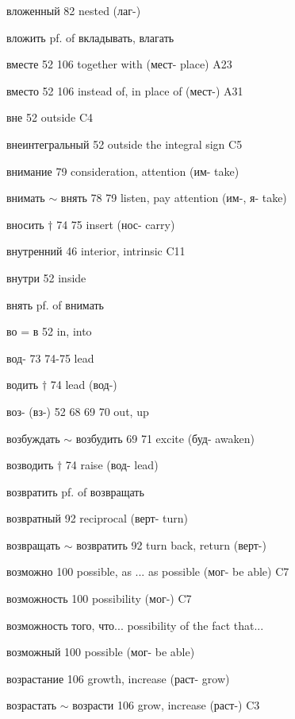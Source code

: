 \begin{minipage}[t]{0.475\textwidth}
\raggedright
\noindent вложенный 82 nested (лаг-)\par
\noindent вложить pf. of вкладывать, влагать\par
\noindent вместе 52 106 together with (мест- place) A23\par
\noindent вместо 52 106 instead of, in place of (мест-) A31\par
\noindent вне 52 outside C4\par
\noindent внеинтегральный 52 outside the integral sign C5\par
\noindent внимание 79 consideration, attention (им- take)\par
\noindent внимать $\sim$ внять 78 79 listen, pay attention (им-, я- take)\par
\noindent вносить $\dagger$ 74 75 insert (нос- carry)\par
\noindent внутренний 46 interior, intrinsic C11\par
\noindent внутри 52 inside\par
\noindent внять pf. of внимать\par
\noindent во = в 52 in, into\par
\noindent вод- 73 74-75 lead\par
\noindent водить $\dagger$ 74 lead (вод-)\par
\noindent воз- (вз-) 52 68 69 70 out, up\par
\noindent возбуждать $\sim$ возбудить 69 71 excite (буд- awaken)\par
\noindent возводить $\dagger$ 74 raise (вод- lead)\par
\noindent возвратить pf. of возвращать\par
\noindent возвратный 92 reciprocal (верт- turn)\par
\noindent возвращать $\sim$ возвратить 92 turn back, return (верт-)\par
\noindent возможно 100 possible, as ... as possible (мог- be able) C7\par
\noindent возможность 100 possibility (мог-) C7\par
\noindent возможность того, что... possibility of the fact that...\par
\noindent возможный 100 possible (мог- be able)\par
\noindent возрастание 106 growth, increase (раст- grow)\par
\noindent возрастать $\sim$ возрасти 106 grow, increase (раст-) C3\par
\end{minipage}
\endgroup

